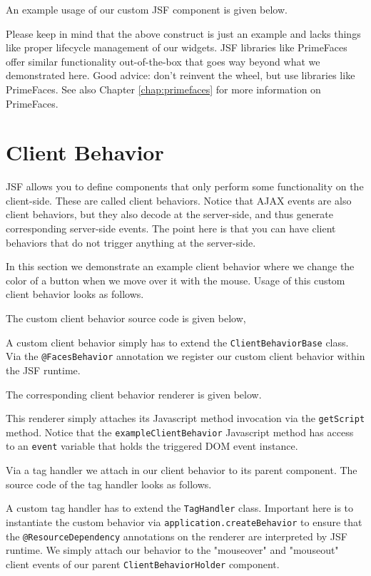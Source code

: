 An example usage of our custom JSF component is given below.

Please keep in mind that the above construct is just an example and lacks things like proper lifecycle management of our widgets.
JSF libraries like PrimeFaces offer similar functionality out-of-the-box that goes way beyond what we demonstrated here.
Good advice: don't reinvent the wheel, but use libraries like PrimeFaces.
See also Chapter \ref{chap:primefaces} for more information on PrimeFaces.

\section{Client Behavior}
JSF allows you to define components that only perform some functionality on the client-side.
These are called client behaviors.
Notice that AJAX events are also client behaviors, but they also decode at the server-side, and thus generate corresponding server-side events.
The point here is that you can have client behaviors that do not trigger anything at the server-side.

In this section we demonstrate an example client behavior where we change the color of a button when we move over it with the mouse.
Usage of this custom client behavior looks as follows.


The custom client behavior source code is given below,

A custom client behavior simply has to extend the \texttt{ClientBehaviorBase} class.
Via the \texttt{@FacesBehavior} annotation we register our custom client behavior within the JSF runtime.

The corresponding client behavior renderer is given below.

This renderer simply attaches its Javascript method invocation via the \texttt{getScript} method.
Notice that the \texttt{exampleClientBehavior} Javascript method has access to an \texttt{event} variable that holds the triggered DOM event instance.

Via a tag handler we attach in our client behavior to its parent component.
The source code of the tag handler looks as follows.

A custom tag handler has to extend the \texttt{TagHandler} class.
Important here is to instantiate the custom behavior via \texttt{application.createBehavior} to ensure that the \texttt{@ResourceDependency} annotations on the renderer are interpreted by JSF runtime.
We simply attach our behavior to the "mouseover" and "mouseout" client events of our parent \texttt{ClientBehaviorHolder} component.

